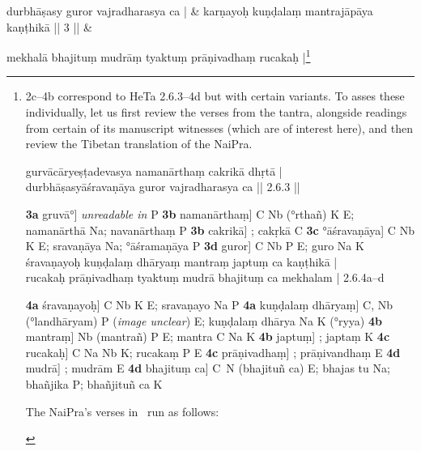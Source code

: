 \documentclass[naipra.tex]{subfiles}
\begin{document}
\begin{sanskrit}
\medskip\versequote
durbhāṣasy guror vajradharasya ca | &
karṇayoḥ kuṇḍalaṃ  mantrajāpāya kaṇṭhikā || 3 || \& 


\medskip\versequote 
mekhalā bhajituṃ mudrāṃ tyaktuṃ prāṇivadhaṃ rucakaḥ |\footnote{
	\begin{english}%
		2c–4b correspond to HeTa 2.6.3–4d but with certain variants.
		To asses these individually, let us first review the verses from the tantra, alongside readings from certain of its manuscript witnesses (which are of interest here), and then review the Tibetan translation of the NaiPra.

		\begin{prosequote}%
			gurvācāryeṣṭadevasya namanārthaṃ cakrikā dhṛtā |\\
			durbhāṣasyāśravaṇāya guror vajradharasya ca || 2.6.3 ||
			\medskip	

			\noindent \textbf{3a} gruvā°] \emph{unreadable in} P
			\textbf{3b} namanārthaṃ] C Nb (°rthañ) K E; namanārthā Na; navanārthaṃ P
			\textbf{3b} cakrikā] ; cakṛkā C
			\textbf{3c} °āśravaṇāya] C Nb K E; sravaṇāya Na; °āśramaṇāya P
			\textbf{3d} guror] C Nb P E; guro Na K\\

			\noindent śravaṇayoḥ kuṇḍalaṃ dhāryaṃ mantraṃ japtuṃ ca kaṇṭhikā |\\
			rucakaḥ prāṇivadhaṃ tyaktuṃ mudrā bhajituṃ ca mekhalam | 2.6.4a–d
			\medskip

			\noindent \textbf{4a} śravaṇayoḥ] C Nb K E; sravaṇayo Na P
			\textbf{4a} kuṇḍalaṃ dhāryaṃ] C, Nb (°landhāryam) P (\emph{image unclear}) E; kuṇḍalaṃ dhārya Na K (°ryya)
			\textbf{4b} mantraṃ] Nb (mantrañ) P E; mantra C Na K
			\textbf{4b} japtuṃ] ; japtaṃ K
			\textbf{4c} rucakaḥ] C Na Nb K; rucakaṃ P E
			\textbf{4c} prāṇivadhaṃ] ; prāṇivandhaṃ E
			\textbf{4d} mudrā] ; mudrām E
			\textbf{4d} bhajituṃ ca] C\PCreading\ N (bhajituñ ca) E; bhajas tu Na; bhañjika P; bhañjituñ ca K
		\end{prosequote}

		The NaiPra's verses in \TIB\ run as follows:


\end{english}}
\end{sanskrit}
\end{document}
